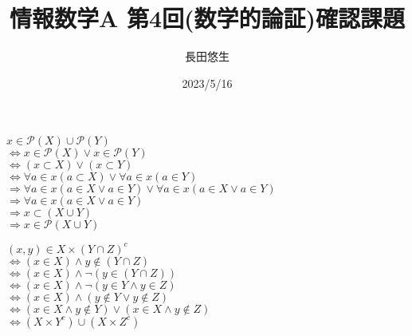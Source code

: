 \documentclass[dvipdfmx,uplatex]{jsarticle}
\title{情報数学A 第4回(数学的論証)確認課題}
\author{長田悠生}
\date{2023/5/16}
\begin{document}
  \begin{titlepage}
    \maketitle
    \begin{center}
      \textmc{\HUGE \LaTeX}
    \end{center}
    \thispagestyle{empty}
  \end{titlepage}
  \begin{center}
  \end{center}
  \begin{flushleft}
    $x \in \mathscr{P}(X) \cup \mathscr{P}(Y)$ \\
    $\Leftrightarrow x \in \mathscr{P}(X) \lor x \in \mathscr{P}(Y)$ \\
    $\Leftrightarrow (x \subset X) \lor (x \subset Y)$ \\
    $\Leftrightarrow \forall a \in x (a \subset X) \lor \forall a \in x (a \in Y)$ \\
    $\Rightarrow \forall a \in x (a \in X \lor a \in Y) \lor \forall a \in x (a \in X \lor a \in Y)$ \\
    $\Rightarrow \forall a \in x (a \in X \lor a \in Y)$ \\
    $\Rightarrow x \subset (X \cup Y)$ \\
    $\Rightarrow x \in \mathscr{P}(X \cup Y)$
  \end{flushleft}

  \begin{center}
  \end{center}
  \begin{flushleft}
    $(x, y) \in X \times (Y \cap Z)^c$ \\
    $\Leftrightarrow (x \in X) \land y \notin (Y \cap Z)$ \\
    $\Leftrightarrow (x \in X) \land \neg (y \in (Y \cap Z))$ \\
    $\Leftrightarrow (x \in X) \land \neg (y \in Y \land y \in Z)$ \\
    $\Leftrightarrow (x \in X) \land (y \notin Y \lor y \notin Z)$ \\
    $\Leftrightarrow (x \in X \land y \notin Y) \lor (x \in X \land y \notin Z)$ \\
    $\Leftrightarrow (X \times Y^c) \cup (X \times Z^c)$
  \end{flushleft}
\end{document}
